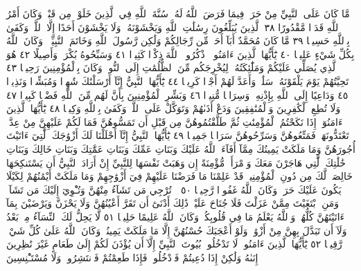 مَّا كَانَ عَلَى ٱلنَّبِيِّ مِنْ حَرَجࣲ فِيمَا فَرَضَ ٱللَّهُ لَهُۥۖ سُنَّةَ ٱللَّهِ فِي
ٱلَّذِينَ خَلَوْا۟ مِن قَبْلُۚ وَكَانَ أَمْرُ ٱللَّهِ قَدَرࣰا مَّقْدُورًا ٣٨ ٱلَّذِينَ
يُبَلِّغُونَ رِسَٰلَٰتِ ٱللَّهِ وَيَخْشَوْنَهُۥ وَلَا يَخْشَوْنَ أَحَدًا إِلَّا ٱللَّهَۗ وَكَفَىٰ
بِٱللَّهِ حَسِيبࣰا ٣٩ مَّا كَانَ مُحَمَّدٌ أَبَآ أَحَدࣲ مِّن رِّجَالِكُمْ وَلَٰكِن
رَّسُولَ ٱللَّهِ وَخَاتَمَ ٱلنَّبِيِّـۧنَۗ وَكَانَ ٱللَّهُ بِكُلِّ شَيْءٍ عَلِيمࣰا ٤٠
يَٰٓأَيُّهَا ٱلَّذِينَ ءَامَنُوا۟ ٱذْكُرُوا۟ ٱللَّهَ ذِكْرࣰا كَثِيرࣰا ٤١ وَسَبِّحُوهُ
بُكْرَةࣰ وَأَصِيلًا ٤٢ هُوَ ٱلَّذِي يُصَلِّي عَلَيْكُمْ وَمَلَٰٓئِكَتُهُۥ
لِيُخْرِجَكُم مِّنَ ٱلظُّلُمَٰتِ إِلَى ٱلنُّورِۚ وَكَانَ بِٱلْمُؤْمِنِينَ رَحِيمࣰا ٤٣
تَحِيَّتُهُمْ يَوْمَ يَلْقَوْنَهُۥ سَلَٰمࣱۚ وَأَعَدَّ لَهُمْ أَجْرࣰا كَرِيمࣰا ٤٤ يَٰٓأَيُّهَا
ٱلنَّبِيُّ إِنَّآ أَرْسَلْنَٰكَ شَٰهِدࣰا وَمُبَشِّرࣰا وَنَذِيرࣰا ٤٥ وَدَاعِيًا
إِلَى ٱللَّهِ بِإِذْنِهِۦ وَسِرَاجࣰا مُّنِيرࣰا ٤٦ وَبَشِّرِ ٱلْمُؤْمِنِينَ بِأَنَّ لَهُم
مِّنَ ٱللَّهِ فَضْلࣰا كَبِيرࣰا ٤٧ وَلَا تُطِعِ ٱلْكَٰفِرِينَ وَٱلْمُنَٰفِقِينَ
وَدَعْ أَذَىٰهُمْ وَتَوَكَّلْ عَلَى ٱللَّهِۚ وَكَفَىٰ بِٱللَّهِ وَكِيلࣰا ٤٨
يَٰٓأَيُّهَا ٱلَّذِينَ ءَامَنُوٓا۟ إِذَا نَكَحْتُمُ ٱلْمُؤْمِنَٰتِ ثُمَّ طَلَّقْتُمُوهُنَّ
مِن قَبْلِ أَن تَمَسُّوهُنَّ فَمَا لَكُمْ عَلَيْهِنَّ مِنْ عِدَّةࣲ تَعْتَدُّونَهَاۖ
فَمَتِّعُوهُنَّ وَسَرِّحُوهُنَّ سَرَاحࣰا جَمِيلࣰا ٤٩ يَٰٓأَيُّهَا ٱلنَّبِيُّ
إِنَّآ أَحْلَلْنَا لَكَ أَزْوَٰجَكَ ٱلَّٰتِيٓ ءَاتَيْتَ أُجُورَهُنَّ وَمَا مَلَكَتْ
يَمِينُكَ مِمَّآ أَفَآءَ ٱللَّهُ عَلَيْكَ وَبَنَاتِ عَمِّكَ وَبَنَاتِ عَمَّٰتِكَ
وَبَنَاتِ خَالِكَ وَبَنَاتِ خَٰلَٰتِكَ ٱلَّٰتِي هَاجَرْنَ مَعَكَ وَٱمْرَأَةࣰ
مُّؤْمِنَةً إِن وَهَبَتْ نَفْسَهَا لِلنَّبِيِّ إِنْ أَرَادَ ٱلنَّبِيُّ أَن يَسْتَنكِحَهَا
خَالِصَةࣰ لَّكَ مِن دُونِ ٱلْمُؤْمِنِينَۗ قَدْ عَلِمْنَا مَا فَرَضْنَا
عَلَيْهِمْ فِيٓ أَزْوَٰجِهِمْ وَمَا مَلَكَتْ أَيْمَٰنُهُمْ لِكَيْلَا
يَكُونَ عَلَيْكَ حَرَجࣱۗ وَكَانَ ٱللَّهُ غَفُورࣰا رَّحِيمࣰا ٥٠
۞ تُرْجِي مَن تَشَآءُ مِنْهُنَّ وَتُـْٔوِيٓ إِلَيْكَ مَن تَشَآءُۖ وَمَنِ ٱبْتَغَيْتَ
مِمَّنْ عَزَلْتَ فَلَا جُنَاحَ عَلَيْكَۚ ذَٰلِكَ أَدْنَىٰٓ أَن تَقَرَّ أَعْيُنُهُنَّ
وَلَا يَحْزَنَّ وَيَرْضَيْنَ بِمَآ ءَاتَيْتَهُنَّ كُلُّهُنَّۚ وَٱللَّهُ يَعْلَمُ
مَا فِي قُلُوبِكُمْۚ وَكَانَ ٱللَّهُ عَلِيمًا حَلِيمࣰا ٥١ لَّا يَحِلُّ لَكَ
ٱلنِّسَآءُ مِنۢ بَعْدُ وَلَآ أَن تَبَدَّلَ بِهِنَّ مِنْ أَزْوَٰجࣲ وَلَوْ أَعْجَبَكَ
حُسْنُهُنَّ إِلَّا مَا مَلَكَتْ يَمِينُكَۗ وَكَانَ ٱللَّهُ عَلَىٰ كُلِّ
شَيْءࣲ رَّقِيبࣰا ٥٢ يَٰٓأَيُّهَا ٱلَّذِينَ ءَامَنُوا۟ لَا تَدْخُلُوا۟ بُيُوتَ ٱلنَّبِيِّ
إِلَّآ أَن يُؤْذَنَ لَكُمْ إِلَىٰ طَعَامٍ غَيْرَ نَٰظِرِينَ إِنَىٰهُ وَلَٰكِنْ
إِذَا دُعِيتُمْ فَٱدْخُلُوا۟ فَإِذَا طَعِمْتُمْ فَٱنتَشِرُوا۟ وَلَا مُسْتَـْٔنِسِينَ
